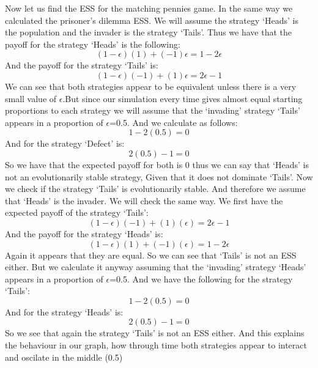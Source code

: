 \documentclass{article}
\begin{document}
Now let us find the ESS for the matching pennies game. In the same way we calculated the prisoner's dilemma ESS. We will assume the strategy  `Heads' is the population and the invader is the strategy `Tails'. Thus we have that the payoff for the strategy `Heads' is the following:
\begin{equation}
(1-{\epsilon})(1) + (-1){\epsilon} = 1 - 2{\epsilon}
\end{equation}
And the payoff for the strategy `Tails' is:
\begin{equation}
(1-{\epsilon})(-1) + (1){\epsilon} = 2{\epsilon} - 1
\end{equation}
We can see that both strategies appear to be equivalent unless there is a very small value of $\epsilon$.But since our simulation every time gives almost equal starting proportions to each strategy we will assume that the `invading' strategy `Tails' appears in a proportion of $\epsilon$=0.5. And we calculate as follows:
\begin{equation}
1- 2(0.5) = 0
\end{equation}
And for the strategy `Defect' is:
\begin{equation}
 2(0.5)- 1 = 0
\end{equation}
So we have that the expected payoff for both is 0 thus we can say that `Heads' is not an evolutionarily stable strategy, Given that it does not dominate `Tails'.
Now we check if the strategy `Tails' is evolutionarily stable. And therefore we assume that `Heads' is the invader. We will check the same way. We first have the expected payoff of the strategy `Tails':
\begin{equation}
(1-{\epsilon})(-1) + (1)({\epsilon}) = 2{\epsilon} -1
\end{equation}
And the payoff for the strategy `Heads' is:
\begin{equation}
(1-{\epsilon})(1) + (-1)({\epsilon}) =  1 - 2{\epsilon}
\end{equation}
Again it appears that they are equal. So we can see that `Tails' is not an ESS either. But we calculate it anyway assuming that the `invading' strategy `Heads' appears in a proportion of $\epsilon$=0.5. And we have the following for the strategy `Tails':
\begin{equation}
1 -  2(0.5) = 0
\end{equation}
And for the strategy `Heads' is:
\begin{equation}
 2(0.5) - 1 = 0
\end{equation}
So we see that again the strategy `Tails' is not an ESS either. And this explains the behaviour in our graph, how through time both strategies appear to interact and oscilate in the middle (0.5)







\newpage


\end{document}
